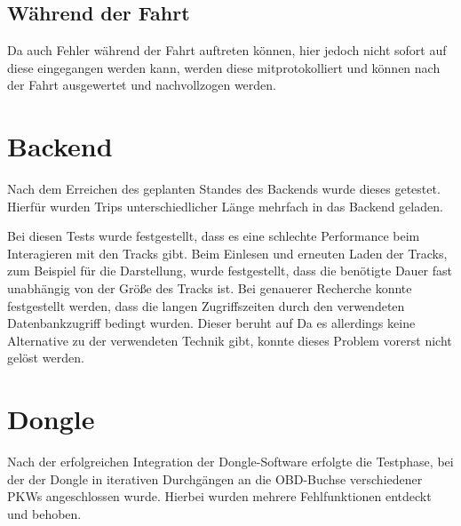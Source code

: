 \subsection{Während der Fahrt}

Da auch Fehler während der Fahrt auftreten können, hier jedoch nicht sofort auf diese eingegangen werden kann, werden diese mitprotokolliert und können nach der Fahrt ausgewertet und nachvollzogen werden. 



\section{Backend}
Nach dem Erreichen des geplanten Standes des Backends wurde dieses getestet. Hierfür wurden Trips unterschiedlicher Länge mehrfach in das Backend geladen. 

Bei diesen Tests wurde festgestellt, dass es eine schlechte Performance beim Interagieren mit den  Tracks gibt.
Beim Einlesen und erneuten Laden der Tracks, zum Beispiel für die Darstellung, wurde festgestellt, dass die benötigte Dauer fast unabhängig von der Größe des Tracks ist. Bei genauerer Recherche konnte festgestellt werden, dass die langen Zugriffszeiten durch den verwendeten Datenbankzugriff bedingt wurden. Dieser beruht auf %
Da es allerdings keine Alternative zu der verwendeten Technik gibt, konnte dieses Problem vorerst nicht gelöst werden.
	


\section{Dongle}
\label{sec:dongleTest}
Nach der erfolgreichen Integration der Dongle-Software erfolgte die Testphase, bei der der Dongle in iterativen Durchgängen an die OBD-Buchse verschiedener PKWs angeschlossen wurde. Hierbei wurden mehrere Fehlfunktionen entdeckt und behoben.
